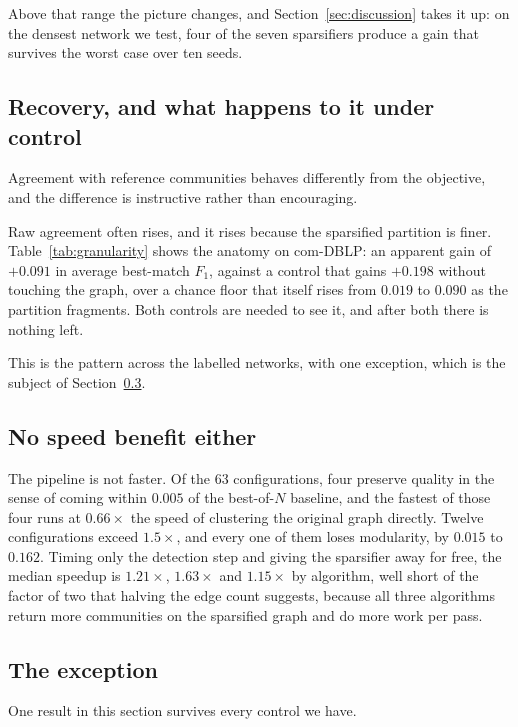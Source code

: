 Above that range the picture changes, and Section~\ref{sec:discussion} takes it up:
on the densest network we test, four of the seven sparsifiers produce a gain that
survives the worst case over ten seeds.

\subsection{Recovery, and what happens to it under control}\label{sec:negative:recovery}

Agreement with reference communities behaves differently from the objective, and
the difference is instructive rather than encouraging.

Raw agreement often rises, and it rises because the sparsified partition is finer.
Table~\ref{tab:granularity} shows the anatomy on com-DBLP: an apparent gain of
$+0.091$ in average best-match $F_1$, against a control that gains $+0.198$ without
touching the graph, over a chance floor that itself rises from $0.019$ to $0.090$
as the partition fragments. Both controls are needed to see it, and after both
there is nothing left.

This is the pattern across the labelled networks, with one exception, which is the
subject of Section~\ref{sec:negative:exception}.

\subsection{No speed benefit either}\label{sec:negative:speed}

The pipeline is not faster. Of the 63 configurations, four preserve quality in the
sense of coming within $0.005$ of the best-of-$N$ baseline, and the fastest of
those four runs at $0.66\times$ the speed of clustering the original graph
directly. Twelve configurations exceed $1.5\times$, and every one of them loses
modularity, by $0.015$ to $0.162$. Timing only the detection step and giving the
sparsifier away for free, the median speedup is $1.21\times$, $1.63\times$ and
$1.15\times$ by algorithm, well short of the factor of two that halving the edge
count suggests, because all three algorithms return more communities on the
sparsified graph and do more work per pass.

\subsection{The exception}\label{sec:negative:exception}

One result in this section survives every control we have.

